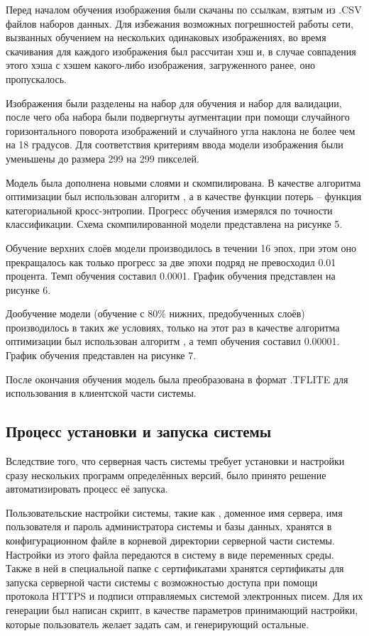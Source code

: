 \tab
Перед началом обучения изображения были скачаны по ссылкам, взятым из .CSV файлов наборов данных.
Для избежания возможных погрешностей работы сети, вызванных обучением на нескольких одинаковых изображениях, во время скачивания для каждого изображения был рассчитан хэш и, в случае совпадения этого хэша с хэшем какого-либо изображения, загруженного ранее, оно пропускалось.

\tab
Изображения были разделены на набор для обучения и набор для валидации, после чего оба набора были подвергнуты аугментации при помощи случайного горизонтального поворота изображений и случайного угла наклона не более чем на 18 градусов.
Для соответствия критериям ввода модели  изображения были уменьшены до размера 299 на 299 пикселей.

\tab
Модель была дополнена новыми слоями и скомпилирована.
В качестве алгоритма оптимизации был использован алгоритм , а в качестве функции потерь -- функция категориальной кросс-энтропии.
Прогресс обучения измерялся по точности классификации.
Схема скомпилированной модели представлена на рисунке 5.
\picturefive

\tab
Обучение верхних слоёв модели производилось в течении 16 эпох, при этом оно прекращалось как только прогресс за две эпохи подряд не превосходил 0.01 процента.
Темп обучения составил 0.0001.
График обучения представлен на рисунке 6.
\picturesix

\tab
Дообучение модели (обучение с 80\%  нижних, предобученных слоёв) производилось в таких же условиях, только на этот раз в качестве алгоритма оптимизации был использован алгоритм , а темп обучения составил 0.00001.
График обучения представлен на рисунке 7.
\pictureseven

\tab
После окончания обучения модель была преобразована в формат .TFLITE для использования в клиентской части системы.

\subsection{Процесс установки и запуска системы}
\label{subsec:installing-and-launching}

\tab
Вследствие того, что серверная часть системы требует установки и настройки сразу нескольких программ определённых версий, было принято решение автоматизировать процесс её запуска.

\tab
Пользовательские настройки системы, такие как , доменное имя сервера, имя пользователя и пароль администратора системы и базы данных, хранятся в конфигурационном файле в корневой директории серверной части системы.
Настройки из этого файла передаются в систему в виде переменных среды.
Также в ней в специальной папке с сертификатами хранятся сертификаты для запуска серверной части системы с возможностью доступа при помощи протокола HTTPS и подписи отправляемых системой электронных писем.
Для их генерации был написан скрипт, в качестве параметров принимающий настройки, которые пользователь желает задать сам, и генерирующий остальные.

